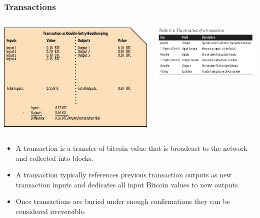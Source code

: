\begin{frame}
    \frametitle{Transactions}
    \begin{columns}
        \begin{column}{0.5\textwidth}
            \includegraphics[scale=0.5]{./figures/mbc2_0203.png}
        \end{column}
        \begin{column}{0.5\textwidth}
            \includegraphics[scale=0.2]{./figures/transaction-data-structure.png}
        \end{column}
    \end{columns}
    \begin{itemize}
        \item A transaction is a transfer of bitcoin value that is broadcast to the network and collected into blocks.
        \item A transaction typically references previous transaction outputs as new transaction inputs and dedicates all input Bitcoin values to new outputs.
        \item Once transactions are buried under enough \alert{confirmations} they can be considered \alert{irreversible}.
    \end{itemize}
\end{frame}

